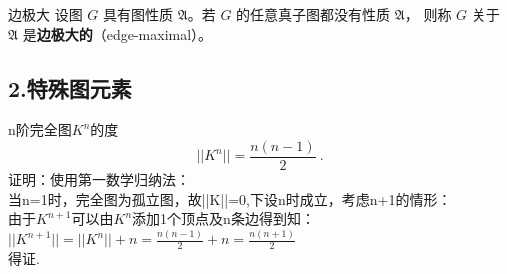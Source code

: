 \begin{definition}{边极大}
设图 $G$ 具有图性质 $\mathfrak A$。若 $G$ 的任意真子图都没有性质 $\mathfrak A$， 则称 $G$ 关于  $\mathfrak A$ 是\textbf{边极大的}（edge-maximal）。
\end{definition}

\subsection{2.特殊图元素}
\begin{theorem}{n阶完全图$K^{n}$的度}
\begin{equation}
||K^{n}||=\frac{n(n-1)}{2}~.
\end{equation}
证明：使用第一数学归纳法：
\\当n=1时，完全图为孤立图，故||K||=0,下设n时成立，考虑n+1的情形：
\\由于$K^{n+1}$可以由$K^{n}$添加1个顶点及n条边得到知：
\\ $||K^{n+1}||=||K^{n}||+n=\frac{n(n-1)}{2}+n=\frac{n(n+1)}{2}$
\\得证.
\end{theorem}
